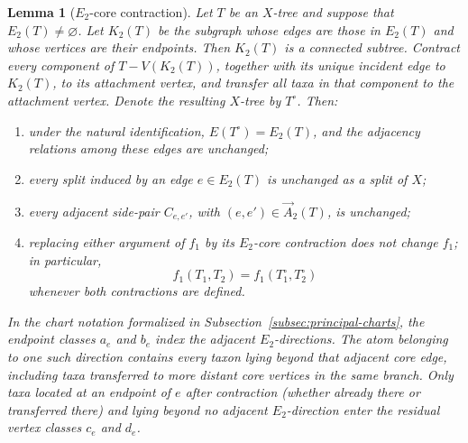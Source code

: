 \documentclass[11pt]{article}
\newtheorem{lemma}[theorem]{Lemma}
\begin{document}
\begin{lemma}[$E_2$-core contraction]\label{lem:E2-core-contraction}
Let $T$ be an $X$-tree and suppose that $E_2(T)\ne\varnothing$.  Let $K_2(T)$ be
the subgraph whose edges are those in $E_2(T)$ and whose vertices are their
endpoints.  Then $K_2(T)$ is a connected subtree.  Contract every component of
$T-V(K_2(T))$, together with its unique incident edge to $K_2(T)$, to its attachment
vertex, and transfer all taxa in that component to the attachment vertex.
Denote the resulting $X$-tree by $T^\circ$.  Then:
\begin{enumerate}[label=\textup{(\roman*)}]
\item under the natural identification, $E(T^\circ)=E_2(T)$, and the
      adjacency relations among these edges are unchanged;
\item every split induced by an edge $e\in E_2(T)$ is unchanged as a split of
      $X$;
\item every adjacent side-pair $C_{e,e'}$, with
      $(e,e')\in\overrightarrow A_2(T)$, is unchanged;
\item replacing either argument of $f_1$ by its $E_2$-core contraction does
      not change $f_1$; in particular,
      \[
      f_1(T_1,T_2)=f_1(T_1^\circ,T_2^\circ)
      \]
      whenever both contractions are defined.
\end{enumerate}
In the chart notation formalized in
Subsection~\ref{subsec:principal-charts}, the endpoint classes $a_e$ and
$b_e$ index the adjacent $E_2$-directions.  The atom belonging to one such
direction contains every taxon lying beyond that adjacent core edge,
including taxa transferred to more distant core vertices in the same
branch.  Only taxa located at an endpoint of $e$ after contraction (whether
already there or transferred there) and lying beyond no adjacent
$E_2$-direction enter the residual vertex classes $c_e$ and $d_e$.
\end{lemma}
\end{document}
